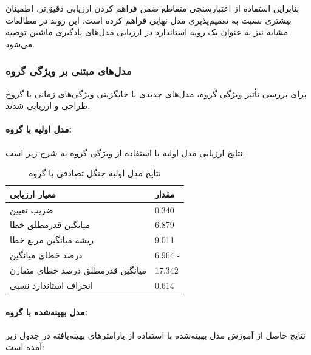 بنابراین استفاده از اعتبارسنجی متقاطع ضمن فراهم کردن ارزیابی دقیق‌تر، اطمینان بیشتری نسبت به تعمیم‌پذیری مدل نهایی فراهم کرده است. این روند در مطالعات مشابه نیز به عنوان یک رویه استاندارد در ارزیابی مدل‌های یادگیری ماشین توصیه می‌شود.


\subsubsection{مدل‌های مبتنی بر ویژگی گروه}

برای بررسی تأثیر ویژگی گروه، مدل‌های جدیدی با جایگزینی ویژگی‌های زمانی با گروخ طراحی و ارزیابی شدند.

\paragraph{مدل اولیه با گروه:} نتایج ارزیابی مدل اولیه با استفاده از ویژگی گروه به شرح زیر است:

\begin{table}[H]
	\centering
	\caption{نتایج مدل اولیه جنگل تصادفی با گروه}
	\renewcommand{\arraystretch}{1.3}
	\begin{tabular}{>{\centering\arraybackslash}m{4cm} >{\centering\arraybackslash}m{3cm}}
		\toprule
		\textbf{معیار ارزیابی} & \textbf{مقدار} \\
		\midrule
		ضریب تعیین & \num{0.340} \\
		میانگین قدرمطلق خطا & \num{6.879} \\
		ریشه میانگین مربع خطا & \num{9.011} \\
		درصد خطای میانگین & \num{6.964} - \\
		میانگین قدرمطلق درصد خطای متقارن & \num{17.342} \\
		انحراف استاندارد نسبی & \num{0.614} \\
		\bottomrule
	\end{tabular}
	\label{tab:rf_grp_initial}
\end{table}

\paragraph{مدل بهینه‌شده با گروه:} نتایج حاصل از آموزش مدل بهینه‌شده با استفاده از پارامترهای بهینه‌یافته در جدول زیر آمده است:

